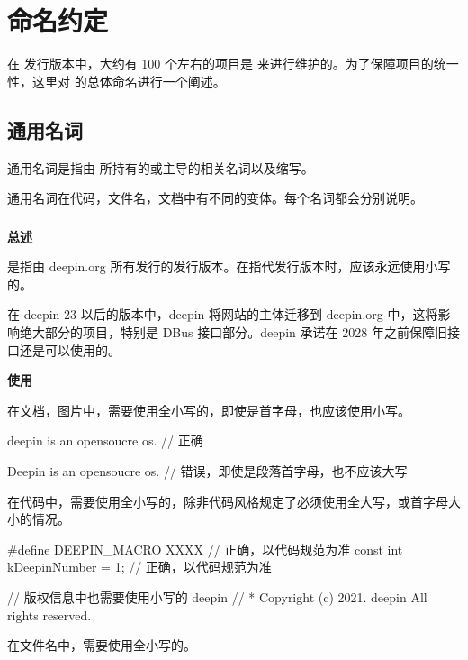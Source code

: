 \chapter{命名约定}

在 \deepin 发行版本中，大约有 100 个左右的项目是 \deepin 来进行维护的。为了保障项目的统一性，这里对 \deepin 的总体命名进行一个阐述。

\section{通用名词} \label{general-naming-define}

通用名词是指由 \deepin 所持有的或主导的相关名词以及缩写。

通用名词在代码，文件名，文档中有不同的变体。每个名词都会分别说明。

\subsection{\deepin}

\textbf{总述}

\deepin 是指由 deepin.org 所有发行的发行版本。在指代发行版本时，应该永远使用小写的\deepin。

\begin{DWarn}
在 deepin 23 以后的版本中，deepin 将网站的主体迁移到 deepin.org 中，这将影响绝大部分的项目，特别是 DBus 接口部分。deepin 承诺在 2028 年之前保障旧接口还是可以使用的。
\end{DWarn}

\textbf{使用}

在文档，图片中，需要使用全小写的\deepin，即使是首字母，也应该使用小写。

\begin{cppcode}
  deepin is an opensoucre os.  // 正确

  Deepin is an opensoucre os.  // 错误，即使是段落首字母，也不应该大写
\end{cppcode}

在代码中，需要使用全小写的\deepin，除非代码风格规定了必须使用全大写，或首字母大小的情况。

\begin{cppcode}
  #define DEEPIN_MACRO XXXX     // 正确，以代码规范为准
  const int kDeepinNumber = 1;  // 正确，以代码规范为准

  // 版权信息中也需要使用小写的 deepin
  // * Copyright (c) 2021. deepin All rights reserved.
\end{cppcode}

在文件名中，需要使用全小写的\deepin。

